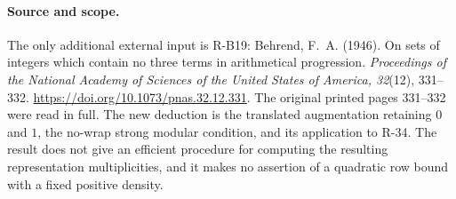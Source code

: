 \paragraph{Source and scope.}
The only additional external input is R-B19: Behrend, F.~A.
(1946). On sets of integers which contain no three terms in
arithmetical progression. \emph{Proceedings of the National Academy
of Sciences of the United States of America, 32}(12), 331--332.
\url{https://doi.org/10.1073/pnas.32.12.331}.
The original printed pages 331--332 were read in full. The new
deduction is the translated augmentation retaining $0$ and $1$,
the no-wrap strong modular condition, and its application to R-34.
The result does not give an efficient procedure for computing the
resulting representation multiplicities, and it makes no assertion
of a quadratic row bound with a fixed positive density.
